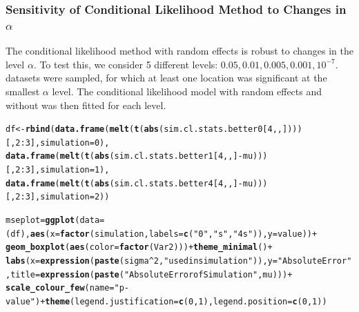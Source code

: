 \documentclass[AMA,STIX1COL]{WileyNJD-v2}\usepackage[]{graphicx}\usepackage[]{color}
\makeatletter
\newcommand{\hlnum}[1]{\textcolor[rgb]{0.686,0.059,0.569}{#1}}%
\newcommand{\hlstr}[1]{\textcolor[rgb]{0.192,0.494,0.8}{#1}}%
\newcommand{\hlopt}[1]{\textcolor[rgb]{0,0,0}{#1}}%
\newcommand{\hlstd}[1]{\textcolor[rgb]{0.345,0.345,0.345}{#1}}%
\newcommand{\hlkwb}[1]{\textcolor[rgb]{0.69,0.353,0.396}{#1}}%
\newcommand{\hlkwc}[1]{\textcolor[rgb]{0.333,0.667,0.333}{#1}}%
\newcommand{\hlkwd}[1]{\textcolor[rgb]{0.737,0.353,0.396}{\textbf{#1}}}%
\newenvironment{kframe}{%
 \def\at@end@of@kframe{}%
 \ifinner\ifhmode%
  \def\at@end@of@kframe{\end{minipage}}%
  \begin{minipage}{\columnwidth}%
 \fi\fi%
 \def\FrameCommand##1{\hskip\@totalleftmargin \hskip-\fboxsep
 \colorbox{shadecolor}{##1}\hskip-\fboxsep
     \hskip-\linewidth \hskip-\@totalleftmargin \hskip\columnwidth}%
 \MakeFramed {\advance\hsize-\width
   \@totalleftmargin\z@ \linewidth\hsize
   \@setminipage}}%
 {\par\unskip\endMakeFramed%
 \at@end@of@kframe}
\newenvironment{knitrout}{}{} %
\makeatother
\begin{document}
\subsubsection{Sensitivity of Conditional Likelihood Method to Changes in $\alpha$}

The conditional likelihood method with random effects is robust to changes in the level $\alpha$. To test this, we consider 5 different levels: $0.05, 0.01, 0.005, 0.001, 10^{-7}$.  datasets were sampled, for which at least one location was significant at the smallest $\alpha$ level. The conditional likelihood model with random effects and without was then fitted for each level. 

\begin{knitrout}
\color{fgcolor}\begin{kframe}
\begin{alltt}
\hlstd{df}\hlkwb{<-} \hlkwd{rbind}\hlstd{(}\hlkwd{data.frame}\hlstd{(}\hlkwd{melt}\hlstd{(}\hlkwd{t}\hlstd{(}\hlkwd{abs}\hlstd{(sim.cl.stats.better0[}\hlnum{4}\hlstd{,,])))[,}\hlnum{2}\hlopt{:}\hlnum{3}\hlstd{],} \hlkwc{simulation}\hlstd{=}\hlnum{0}\hlstd{),}
           \hlkwd{data.frame}\hlstd{(}\hlkwd{melt}\hlstd{(}\hlkwd{t}\hlstd{(}\hlkwd{abs}\hlstd{(sim.cl.stats.better1[}\hlnum{4}\hlstd{,,]}\hlopt{-}\hlstd{mu)))[,}\hlnum{2}\hlopt{:}\hlnum{3}\hlstd{],} \hlkwc{simulation}\hlstd{=}\hlnum{1}\hlstd{),}
           \hlkwd{data.frame}\hlstd{(}\hlkwd{melt}\hlstd{(}\hlkwd{t}\hlstd{(}\hlkwd{abs}\hlstd{(sim.cl.stats.better4[}\hlnum{4}\hlstd{,,]}\hlopt{-}\hlstd{mu)))[,}\hlnum{2}\hlopt{:}\hlnum{3}\hlstd{],} \hlkwc{simulation}\hlstd{=}\hlnum{2}\hlstd{))}

\hlstd{mseplot} \hlkwb{=} \hlkwd{ggplot}\hlstd{(}\hlkwc{data} \hlstd{= (df),} \hlkwd{aes}\hlstd{(}\hlkwc{x}\hlstd{=}\hlkwd{factor}\hlstd{(simulation,} \hlkwc{labels}\hlstd{=}\hlkwd{c}\hlstd{(} \hlstr{"0"}\hlstd{,} \hlstr{"s"}\hlstd{,} \hlstr{"4s"}\hlstd{)),} \hlkwc{y}\hlstd{=value))} \hlopt{+}
  \hlkwd{geom_boxplot}\hlstd{(}\hlkwd{aes}\hlstd{(}\hlkwc{color}\hlstd{=}\hlkwd{factor}\hlstd{(Var2)))}\hlopt{+}  \hlkwd{theme_minimal}\hlstd{()} \hlopt{+}
  \hlkwd{labs}\hlstd{(}\hlkwc{x}\hlstd{=}\hlkwd{expression}\hlstd{(}\hlkwd{paste}\hlstd{(sigma}\hlopt{^}\hlnum{2}\hlstd{,} \hlstr{" used in simulation"}\hlstd{)),}\hlkwc{y}\hlstd{=}\hlstr{"Absolute Error"}\hlstd{,} \hlkwc{title}\hlstd{=}\hlkwd{expression}\hlstd{(}\hlkwd{paste}\hlstd{(}\hlstr{"Absolute Error of Simulation "}\hlstd{,mu )))}\hlopt{+}
  \hlkwd{scale_colour_few}\hlstd{(}\hlkwc{name}\hlstd{=}\hlstr{"p-value"}\hlstd{)} \hlopt{+}  \hlkwd{theme}\hlstd{(} \hlkwc{legend.justification}\hlstd{=}\hlkwd{c}\hlstd{(}\hlnum{0}\hlstd{,}\hlnum{1}\hlstd{),} \hlkwc{legend.position}\hlstd{=}\hlkwd{c}\hlstd{(}\hlnum{0}\hlstd{,}\hlnum{1}\hlstd{))}



\end{alltt}
\end{kframe}
\end{knitrout}
\end{document}
